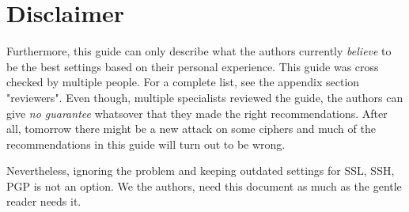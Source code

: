 \section{Disclaimer}
Furthermore, this guide can only describe what the authors currently \emph{believe} to be the best settings based on their personal experience. This guide was cross checked by multiple people. For a complete list, see the appendix section "reviewers". Even though, multiple specialists reviewed the guide, the authors can give \emph{no guarantee} whatsover that they made the right recommendations. After all, tomorrow there might be a new attack on some ciphers and much of the recommendations in this guide will turn out to be wrong.


Nevertheless, ignoring the problem and keeping outdated settings for SSL, SSH, PGP is not an option. We the authors, need this document as much as the gentle reader needs it.


